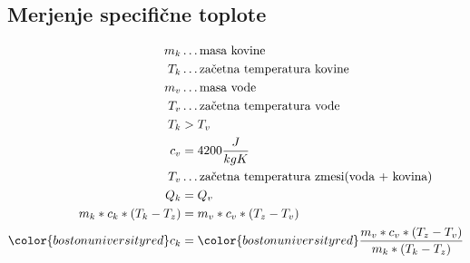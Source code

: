 {\color{indiagreen}\subsection{Merjenje specifične toplote}}
\begin{align*}
	m_k &\dots \text{masa kovine}\\
	T_k &\dots \text{začetna temperatura kovine}\\
	m_v &\dots \text{masa vode}\\
	T_v &\dots \text{začetna temperatura vode}\\
	T_k &>T_v\\
	c_v &= 4200\frac{J}{kgK}\\
	T_v &\dots \text{začetna temperatura zmesi(voda + kovina)}\\
	Q_k &= Q_v\\
	m_k * c_k * (T_k-T_z) &= m_v * c_v * (T_z-T_v)\\
	{\color{bostonuniversityred}c_k} &= {\color{bostonuniversityred}\frac{m_v * c_v * (T_z-T_v)}{m_k * (T_k-T_z)}}\\	
\end{align*}